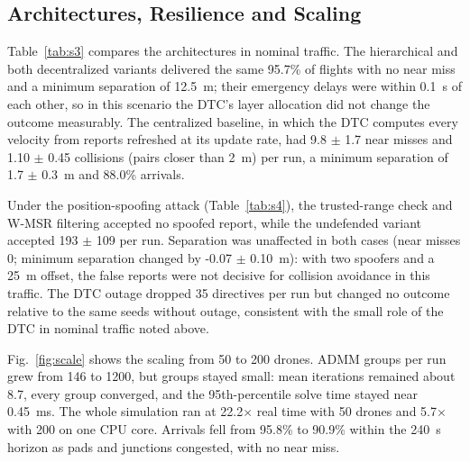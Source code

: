 \documentclass[journal]{IEEEtran}
\begin{document}
\subsection{Architectures, Resilience and Scaling}
Table~\ref{tab:s3} compares the architectures in nominal traffic. The hierarchical and both decentralized variants delivered the same 95.7\% of flights with no near miss and a minimum separation of 12.5~m; their emergency delays were within 0.1~s of each other, so in this scenario the DTC's layer allocation did not change the outcome measurably. The centralized baseline, in which the DTC computes every velocity from reports refreshed at its update rate, had 9.8 $\pm$ 1.7 near misses and 1.10 $\pm$ 0.45 collisions (pairs closer than 2~m) per run, a minimum separation of 1.7 $\pm$ 0.3~m and 88.0\% arrivals.

Under the position-spoofing attack (Table~\ref{tab:s4}), the trusted-range check and W-MSR filtering accepted no spoofed report, while the undefended variant accepted 193 $\pm$ 109 per run. Separation was unaffected in both cases (near misses 0; minimum separation changed by -0.07 $\pm$ 0.10~m): with two spoofers and a 25~m offset, the false reports were not decisive for collision avoidance in this traffic. The DTC outage dropped 35 directives per run but changed no outcome relative to the same seeds without outage, consistent with the small role of the DTC in nominal traffic noted above.

Fig.~\ref{fig:scale} shows the scaling from 50 to 200 drones. ADMM groups per run grew from 146 to 1200, but groups stayed small: mean iterations remained about 8.7, every group converged, and the 95th-percentile solve time stayed near 0.45~ms. The whole simulation ran at 22.2$\times$ real time with 50 drones and 5.7$\times$ with 200 on one CPU core. Arrivals fell from 95.8\% to 90.9\% within the 240~s horizon as pads and junctions congested, with no near miss.
\end{document}
